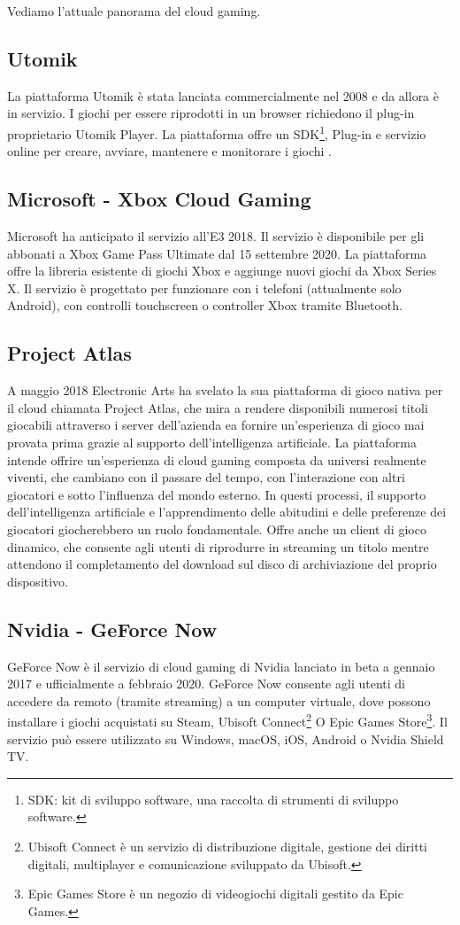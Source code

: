 Vediamo l'attuale panorama del cloud gaming.

\subsection{Utomik}
La piattaforma Utomik è stata lanciata commercialmente nel 2008 e da allora è in servizio. I giochi per essere riprodotti in un browser richiedono il plug-in proprietario Utomik Player. La piattaforma offre un SDK\footnote{SDK: kit di sviluppo software, una raccolta di strumenti di sviluppo software.}, Plug-in e servizio online per creare, avviare, mantenere e monitorare i giochi \cite{Utomik}.

\subsection{Microsoft - Xbox Cloud Gaming}
Microsoft ha anticipato il servizio all'E3 2018. Il servizio è disponibile per gli abbonati a Xbox Game Pass Ultimate dal 15 settembre 2020. La piattaforma offre la libreria esistente di giochi Xbox e aggiunge nuovi giochi da Xbox Series X. Il servizio è progettato per funzionare con i telefoni (attualmente solo Android), con controlli touchscreen o controller Xbox tramite Bluetooth\cite{Xbox_Game_Pass_cloud_gaming}.

\subsection{Project Atlas}
A maggio 2018 Electronic Arts ha svelato la sua piattaforma di gioco nativa per il cloud chiamata Project Atlas, che mira a rendere disponibili numerosi titoli giocabili attraverso i server dell'azienda ea fornire un'esperienza di gioco mai provata prima grazie al supporto dell'intelligenza artificiale. La piattaforma intende offrire un'esperienza di cloud gaming composta da universi realmente viventi, che cambiano con il passare del tempo, con l'interazione con altri giocatori e sotto l'influenza del mondo esterno. In questi processi, il supporto dell'intelligenza artificiale e l'apprendimento delle abitudini e delle preferenze dei giocatori giocherebbero un ruolo fondamentale. Offre anche un client di gioco dinamico, che consente agli utenti di riprodurre in streaming un titolo mentre attendono il completamento del download sul disco di archiviazione del proprio dispositivo\cite{Project_Atlas}.

\subsection{Nvidia - GeForce Now}
GeForce Now è il servizio di cloud gaming di Nvidia lanciato in beta a gennaio 2017 e ufficialmente a febbraio 2020. GeForce Now consente agli utenti di accedere da remoto (tramite streaming) a un computer virtuale, dove possono installare i giochi acquistati su Steam, Ubisoft Connect\footnote{Ubisoft Connect è un servizio di distribuzione digitale, gestione dei diritti digitali, multiplayer e comunicazione sviluppato da Ubisoft.} O Epic Games Store\footnote{Epic Games Store è un negozio di videogiochi digitali gestito da Epic Games.}. Il servizio può essere utilizzato su Windows, macOS, iOS, Android o Nvidia Shield TV\cite{GeForce_Now}.

